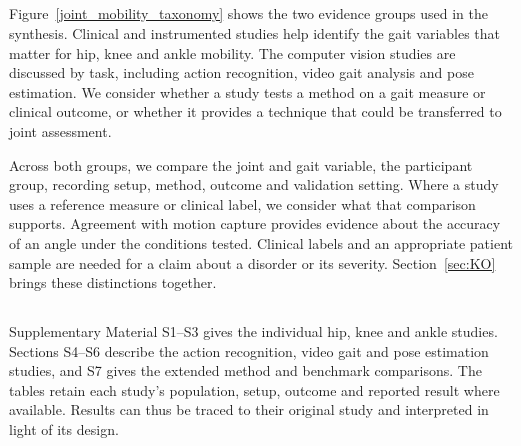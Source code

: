 \subsection{}
\label{sec:classification}
\begin{redrevision}
Figure~\ref{joint_mobility_taxonomy} shows the two evidence groups used in the synthesis. Clinical and instrumented studies help identify the gait variables that matter for hip, knee and ankle mobility. The computer vision studies are discussed by task, including action recognition, video gait analysis and pose estimation. We consider whether a study tests a method on a gait measure or clinical outcome, or whether it provides a technique that could be transferred to joint assessment.

Across both groups, we compare the joint and gait variable, the participant group, recording setup, method, outcome and validation setting. Where a study uses a reference measure or clinical label, we consider what that comparison supports. Agreement with motion capture provides evidence about the accuracy of an angle under the conditions tested. Clinical labels and an appropriate patient sample are needed for a claim about a disorder or its severity. Section~\ref{sec:KO} brings these distinctions together.
\end{redrevision}



\subsection{}
\label{sec:supplement_traceability}
\begin{redrevision}
Supplementary Material S1--S3 gives the individual hip, knee and ankle studies. Sections S4--S6 describe the action recognition, video gait and pose estimation studies, and S7 gives the extended method and benchmark comparisons. The tables retain each study's population, setup, outcome and reported result where available. Results can thus be traced to their original study and interpreted in light of its design.
\end{redrevision}

